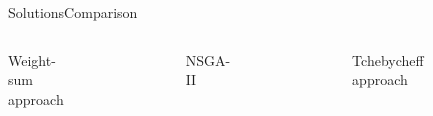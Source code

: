 \begin{frame}{Solutions}{Comparison}
\begin{columns}
	{ Weight-sum approach}
	\begin{figure}
		\centering
		\includegraphics[width=\linewidth]{figure/sim1-2obj/MORRTstar00-ALL.png}
		\label{fig:sim:01:sol1}
	\end{figure}
	{ NSGA-II \newline}
	\begin{figure}
		\centering
		\includegraphics[width=\linewidth]{figure/sim3-2obj/MOPath01-ALL.png}
		\label{fig:sim:01:sol2}
	\end{figure}
	{ Tchebycheff approach}
	\begin{figure}
		\centering

\end{figure}
\end{columns}
\end{frame}
